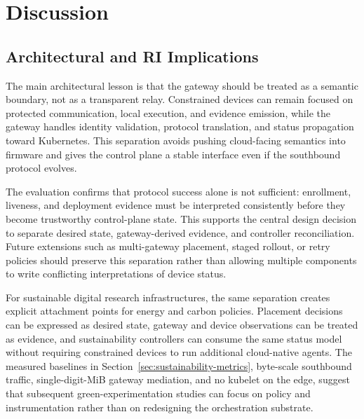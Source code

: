 \section{Discussion}\label{sec:discussion}

\subsection{Architectural and RI Implications}
The main architectural lesson is that the gateway should be treated as a semantic boundary, not as a transparent relay. Constrained devices can remain focused on protected communication, local execution, and evidence emission, while the gateway handles identity validation, protocol translation, and status propagation toward Kubernetes. This separation avoids pushing cloud-facing semantics into firmware and gives the control plane a stable interface even if the southbound protocol evolves.

The evaluation confirms that protocol success alone is not sufficient: enrollment, liveness, and deployment evidence must be interpreted consistently before they become trustworthy control-plane state. This supports the central design decision to separate desired state, gateway-derived evidence, and controller reconciliation. Future extensions such as multi-gateway placement, staged rollout, or retry policies should preserve this separation rather than allowing multiple components to write conflicting interpretations of device status.

For sustainable digital research infrastructures, the same separation creates explicit attachment points for energy and carbon policies. Placement decisions can be expressed as desired state, gateway and device observations can be treated as evidence, and sustainability controllers can consume the same status model without requiring constrained devices to run additional cloud-native agents. The measured baselines in Section~\ref{sec:sustainability-metrics}, byte-scale southbound traffic, single-digit-MiB gateway mediation, and no kubelet on the edge, suggest that subsequent green-experimentation studies can focus on policy and instrumentation rather than on redesigning the orchestration substrate.


